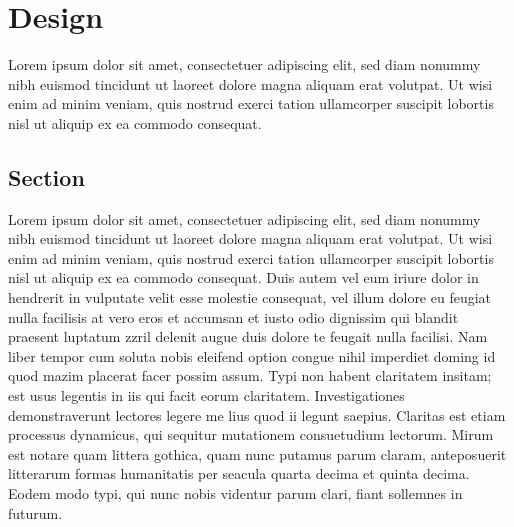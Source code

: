\newpage
\chapter{Design}
Lorem ipsum dolor sit amet, consectetuer adipiscing elit, sed diam nonummy nibh euismod tincidunt ut laoreet dolore magna aliquam erat volutpat. Ut wisi enim ad minim veniam, quis nostrud exerci tation ullamcorper suscipit lobortis nisl ut aliquip ex ea commodo consequat. 

\section{Section}
\label{section}

Lorem ipsum dolor sit amet, consectetuer adipiscing elit, sed diam nonummy nibh euismod tincidunt ut laoreet dolore magna aliquam erat volutpat. Ut wisi enim ad minim veniam, quis nostrud exerci tation ullamcorper suscipit lobortis nisl ut aliquip ex ea commodo consequat. Duis autem vel eum iriure dolor in hendrerit in vulputate velit esse molestie consequat, vel illum dolore eu feugiat nulla facilisis at vero eros et accumsan et iusto odio dignissim qui blandit praesent luptatum zzril delenit augue duis dolore te feugait nulla facilisi. Nam liber tempor cum soluta nobis eleifend option congue nihil imperdiet doming id quod mazim placerat facer possim assum. Typi non habent claritatem insitam; est usus legentis in iis qui facit eorum claritatem. Investigationes demonstraverunt lectores legere me lius quod ii legunt saepius. Claritas est etiam processus dynamicus, qui sequitur mutationem consuetudium lectorum. Mirum est notare quam littera gothica, quam nunc putamus parum claram, anteposuerit litterarum formas humanitatis per seacula quarta decima et quinta decima. Eodem modo typi, qui nunc nobis videntur parum clari, fiant sollemnes in futurum.